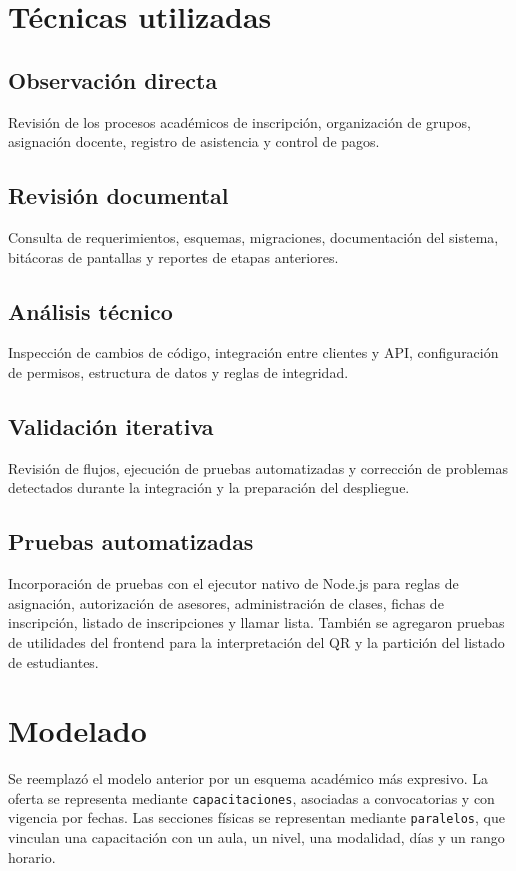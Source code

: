 \documentclass[12pt,a4paper,oneside]{report}
\begin{document}
\section{Técnicas utilizadas}

\subsection{Observación directa}
Revisión de los procesos académicos de inscripción, organización de grupos, asignación docente, registro de asistencia y control de pagos.

\subsection{Revisión documental}
Consulta de requerimientos, esquemas, migraciones, documentación del sistema, bitácoras de pantallas y reportes de etapas anteriores.

\subsection{Análisis técnico}
Inspección de cambios de código, integración entre clientes y API, configuración de permisos, estructura de datos y reglas de integridad.

\subsection{Validación iterativa}
Revisión de flujos, ejecución de pruebas automatizadas y corrección de problemas detectados durante la integración y la preparación del despliegue.

\subsection{Pruebas automatizadas}
Incorporación de pruebas con el ejecutor nativo de Node.js para reglas de asignación, autorización de asesores, administración de clases, fichas de inscripción, listado de inscripciones y llamar lista. También se agregaron pruebas de utilidades del frontend para la interpretación del QR y la partición del listado de estudiantes.

\section{Modelado}

Se reemplazó el modelo anterior por un esquema académico más expresivo. La oferta se representa mediante \texttt{capacitaciones}, asociadas a convocatorias y con vigencia por fechas. Las secciones físicas se representan mediante \texttt{paralelos}, que vinculan una capacitación con un aula, un nivel, una modalidad, días y un rango horario.
\end{document}
